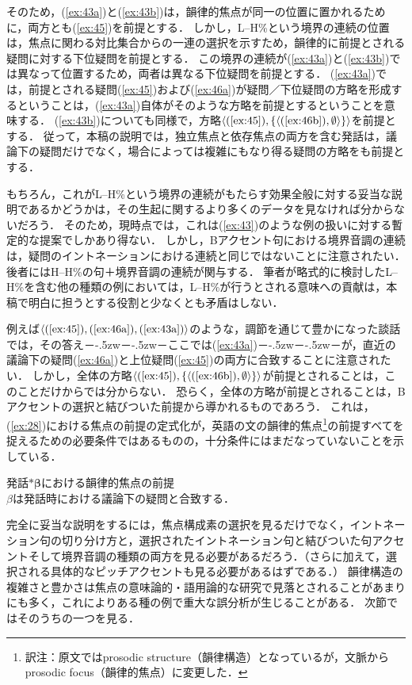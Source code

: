 \documentclass{goken}
\def\ddash{－\kern-.5zw－\kern-.5zw－}
\newcommand{\ori}[1]{\noindent\textcolor[gray]{0.7}{\fontsize{8pt}{8pt}\selectfont{\textsf{(p.~#1)}}} }
\begin{document}
\noindent
そのため，(\ref{ex:43a})と(\ref{ex:43b})は，韻律的焦点が同一の位置に置かれるために，両方とも(\ref{ex:45})を前提とする．
しかし，L--H\%という境界の連続の位置は，焦点に関わる対比集合からの一連の選択を示すため，韻律的に前提とされる疑問に対する下位疑問を前提とする．
この境界の連続が(\ref{ex:43a})と(\ref{ex:43b})では異なって位置するため，両者は異なる下位疑問を前提とする．
(\ref{ex:43a})では，前提とされる疑問(\ref{ex:45})および(\ref{ex:46a})が疑問／下位疑問の方略を形成するということは，(\ref{ex:43a})自体がそのような方略を前提とするということを意味する．
(\ref{ex:43b})についても同様で，方略$\langle(\ref{ex:45}), \{\langle(\text{\ref{ex:46b}}), \emptyset\rangle\}\rangle$を前提とする．
従って，本稿の説明では，独立焦点と依存焦点の両方を含む発話は，議論下の疑問だけでなく，場合によっては複雑にもなり得る疑問の方略をも前提とする．

もちろん，これがL--H\%という境界の連続がもたらす効果全般に対する妥当な説明であるかどうかは，その生起に関するより多くのデータを見なければ分からないだろう．
そのため，現時点では，これは(\ref{ex:43})のような例の扱いに対する暫定的な提案でしかあり得ない．
しかし，Bアクセント句における境界音調の連続は，疑問のイントネーションにおける連続と同じではないことに注意されたい．後者にはH--H\%の句＋境界音調の連続が関与する．
筆者が略式的に検討したL--H\%を含む他の種類の例においては，L--H\%が行うとされる意味への貢献は，本稿で明白に担うとする役割と少なくとも矛盾はしない．

例えば$\langle(\ref{ex:45}), (\text{\ref{ex:46a}}), (\text{\ref{ex:43a}})\rangle$のような，調節を通じて豊かになった談話では，その答え\ddash{}ここでは(\ref{ex:43a})\ddash{}が，直近の議論下の疑問(\ref{ex:46a})と上位疑問(\ref{ex:45})の両方に合致することに注意されたい．
しかし，全体の方略$\langle(\ref{ex:45}), \{\langle(\text{\ref{ex:46b}}), \emptyset\rangle\}\rangle$が前提とされることは，このことだけからでは分からない．
恐らく，全体の方略が前提とされることは，Bアクセントの選択と結びついた前提から導かれるものであろう．
\setcounter{footnote}{0}
これは，(\ref{ex:28})における焦点の前提の定式化が，英語の文の韻律的焦点\footnote{訳注：原文ではprosodic structure（韻律構造）となっているが，文脈からprosodic focus（韻律的焦点）に変更した．}の前提すべてを捉えるための必要条件ではあるものの，十分条件にはまだなっていないことを示している．
\renewcommand{\thefootnote}{\arabic{footnote}~}
\setcounter{footnote}{29}
\setcounter{exx}{27}
\begin{exe}
	\ex \textsf{発話$\boldsymbol{\ast\beta}$における韻律的焦点の前提}\\
%
  $\beta$は発話時における議論下の疑問と合致する．
\end{exe}
\setcounter{exx}{49}
\noindent
完全に妥当な説明をするには，焦点構成素の選択を見るだけでなく，イントネーション句の切り分け方と，選択されたイントネーション句と結びついた句アクセントそして境界音調の種類の両方を見る必要があるだろう．（さらに加えて，選択される具体的なピッチアクセントも見る必要があるはずである．）
\ori{51}
韻律構造の複雑さと豊かさは焦点の意味論的・語用論的な研究で見落とされることがあまりにも多く，これによりある種の例で重大な誤分析が生じることがある．
次節ではそのうちの一つを見る．
\end{document}
